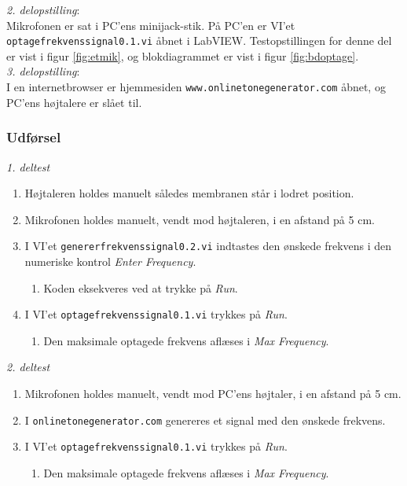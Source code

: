		\textit{2. delopstilling}:\\
		Mikrofonen er sat i PC'ens minijack-stik. På PC'en er VI'et \texttt{optagefrekvenssignal0.1.vi} åbnet i LabVIEW. Testopstillingen for denne del er vist i figur \ref{fig:etmik}, og blokdiagrammet er vist i figur \ref{fig:bdoptage}.\\  
		
		\textit{3. delopstilling}:\\
		I en internetbrowser er hjemmesiden \texttt{www.onlinetonegenerator.com} åbnet, og PC'ens højtalere er slået til. 
		
		\subsubsection{Udførsel}
			
			\textit{1. deltest}
			\begin{enumerate}
				\item Højtaleren holdes manuelt således membranen står i lodret position. 
				\item Mikrofonen holdes manuelt, vendt mod højtaleren, i en afstand på 5 cm. 
				\item I VI'et \texttt{genererfrekvenssignal0.2.vi} indtastes den ønskede frekvens i den numeriske kontrol \textit{Enter Frequency}. 
					\begin{enumerate}
						\item Koden eksekveres ved at trykke på \textit{Run}. 
					\end{enumerate} 
				\item I VI'et \texttt{optagefrekvenssignal0.1.vi} trykkes på \textit{Run}. 
					\begin{enumerate}
						\item Den maksimale optagede frekvens aflæses i \textit{Max Frequency}. 
					\end{enumerate}	 	
			\end{enumerate}
			
			
			\textit{2. deltest}			
			\begin{enumerate}
				\item Mikrofonen holdes manuelt, vendt mod PC'ens højtaler, i en afstand på 5 cm. 
				\item I \texttt{onlinetonegenerator.com} genereres et signal med den ønskede frekvens. 
				\item I VI'et \texttt{optagefrekvenssignal0.1.vi} trykkes på \textit{Run}. 
					\begin{enumerate}
						\item Den maksimale optagede frekvens aflæses i \textit{Max Frequency}. 
					\end{enumerate}	  
			\end{enumerate}
		
